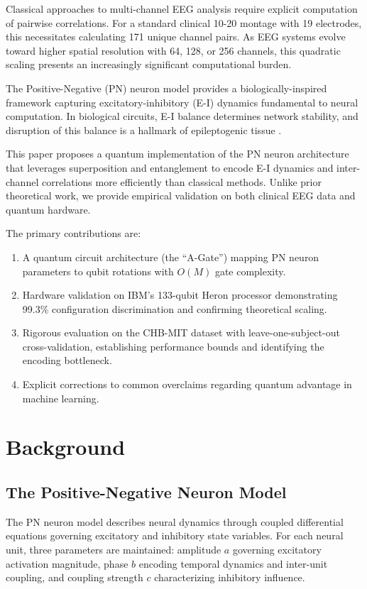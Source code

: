 \documentclass[11pt,a4paper]{article}
\begin{document}
Classical approaches to multi-channel EEG analysis require explicit computation of pairwise correlations. For a standard clinical 10-20 montage with 19 electrodes, this necessitates calculating 171 unique channel pairs. As EEG systems evolve toward higher spatial resolution with 64, 128, or 256 channels, this quadratic scaling presents an increasingly significant computational burden.

The Positive-Negative (PN) neuron model \citep{gupta2003} provides a biologically-inspired framework capturing excitatory-inhibitory (E-I) dynamics fundamental to neural computation. In biological circuits, E-I balance determines network stability, and disruption of this balance is a hallmark of epileptogenic tissue \citep{buzsaki2012}.

This paper proposes a quantum implementation of the PN neuron architecture that leverages superposition and entanglement to encode E-I dynamics and inter-channel correlations more efficiently than classical methods. Unlike prior theoretical work, we provide empirical validation on both clinical EEG data and quantum hardware.

The primary contributions are:
\begin{enumerate}
    \item A quantum circuit architecture (the ``A-Gate'') mapping PN neuron parameters to qubit rotations with $O(M)$ gate complexity.
    \item Hardware validation on IBM's 133-qubit Heron processor demonstrating 99.3\% configuration discrimination and confirming theoretical scaling.
    \item Rigorous evaluation on the CHB-MIT dataset with leave-one-subject-out cross-validation, establishing performance bounds and identifying the encoding bottleneck.
    \item Explicit corrections to common overclaims regarding quantum advantage in machine learning.
\end{enumerate}

\section{Background}

\subsection{The Positive-Negative Neuron Model}

The PN neuron model describes neural dynamics through coupled differential equations governing excitatory and inhibitory state variables. For each neural unit, three parameters are maintained: amplitude $a$ governing excitatory activation magnitude, phase $b$ encoding temporal dynamics and inter-unit coupling, and coupling strength $c$ characterizing inhibitory influence.
\end{document}
